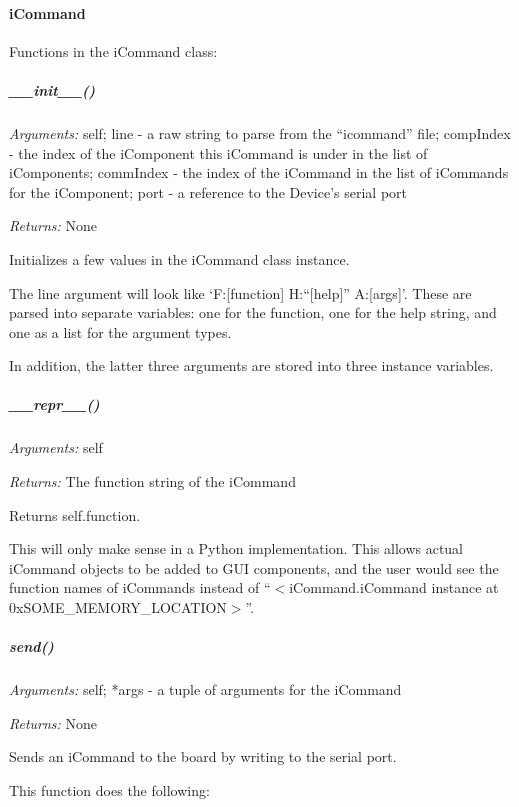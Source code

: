 \documentclass[12pt,letterpaper]{article}
\begin{document}
%
%
\paragraph{iCommand}
\label{4.5.1.0}

Functions in the iCommand class:

\setcounter{subparagraph}{-1}



%
%
\subparagraph{\_\_init\_\_()}
\label{4.5.1.0.0}

\emph{Arguments:} self; line - a raw string to parse from the ``icommand'' file; compIndex - the index of the iComponent this iCommand is under in the list of iComponents; commIndex - the index of the iCommand in the list of iCommands for the iComponent; port - a reference to the Device's serial port

\emph{Returns:} None

Initializes a few values in the iCommand class instance.

The line argument will look like `F:[function] H:``[help]'' A:[args]'. These are parsed into separate variables: one for the function, one for the help string, and one as a list for the argument types.

In addition, the latter three arguments are stored into three instance variables.



%
%
\subparagraph{\_\_repr\_\_()}
\label{4.5.1.0.1}

\emph{Arguments:} self

\emph{Returns:} The function string of the iCommand

Returns self.function.

This will only make sense in a Python implementation. This allows actual iCommand objects to be added to GUI components, and the user would see the function names of iCommands instead of ``$<$iCommand.iCommand instance at 0xSOME\_MEMORY\_LOCATION$>$''.



%
%
\subparagraph{send()}
\label{4.5.1.0.2}

\emph{Arguments:} self; *args - a tuple of arguments for the iCommand

\emph{Returns:} None

Sends an iCommand to the board by writing to the serial port.

This function does the following:
\end{document}
